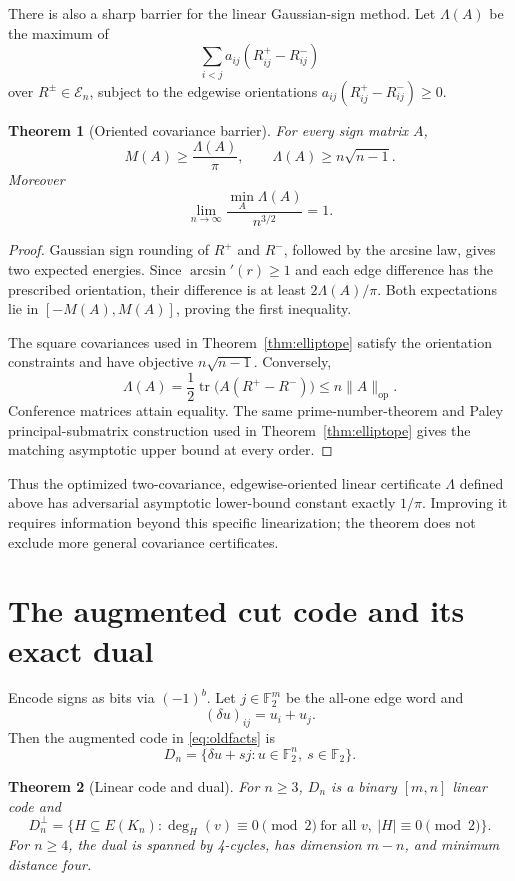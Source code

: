 \documentclass[11pt]{article}
\newtheorem{theorem}{Theorem}
\newcommand{\cE}{\mathcal E}
\newcommand{\Ftwo}{\mathbb F_2}
\DeclareMathOperator{\tr}{tr}
\begin{document}
There is also a sharp barrier for the linear Gaussian-sign method.  Let
\(\Lambda(A)\) be the maximum of
\[
 \sum_{i<j}a_{ij}(R^+_{ij}-R^-_{ij})
\]
over \(R^\pm\in\cE_n\), subject to the edgewise orientations
\(a_{ij}(R^+_{ij}-R^-_{ij})\ge0\).

\begin{theorem}[Oriented covariance barrier]
\label{thm:lambda}
For every sign matrix \(A\),
\[
 M(A)\ge\frac{\Lambda(A)}\pi,
 \qquad
 \Lambda(A)\ge n\sqrt{n-1}.
\]
Moreover
\[
 \boxed{\displaystyle
 \lim_{n\to\infty}
 \frac{\min_A\Lambda(A)}{n^{3/2}}=1.}
\]
\end{theorem}

\begin{proof}
Gaussian sign rounding of \(R^+\) and \(R^-\), followed by the arcsine law,
gives two expected energies.  Since \(\arcsin'(r)\ge1\) and each edge
difference has the prescribed orientation, their difference is at least
\(2\Lambda(A)/\pi\).  Both expectations lie in \([-M(A),M(A)]\), proving the
first inequality.

The square covariances used in Theorem~\ref{thm:elliptope} satisfy the
orientation constraints and have objective \(n\sqrt{n-1}\).  Conversely,
\[
 \Lambda(A)=\frac12\tr\bigl(A(R^+-R^-)\bigr)
 \le n\|A\|_{\mathrm{op}}.
\]
Conference matrices attain equality.  The same prime-number-theorem and Paley
principal-submatrix construction used in Theorem~\ref{thm:elliptope} gives the
matching asymptotic upper bound at every order.
\end{proof}

Thus the optimized two-covariance, edgewise-oriented linear certificate
\(\Lambda\) defined above has adversarial asymptotic lower-bound constant
exactly \(1/\pi\).  Improving it requires information beyond this specific
linearization; the theorem does not exclude more general covariance
certificates.

\section{The augmented cut code and its exact dual}

Encode signs as bits via \((-1)^b\).  Let \(j\in\Ftwo^m\) be the all-one edge
word and
\[
 (\delta u)_{ij}=u_i+u_j.
\]
Then the augmented code in \eqref{eq:oldfacts} is
\[
 D_n=\{\delta u+s j:u\in\Ftwo^n,\ s\in\Ftwo\}.
\]

\begin{theorem}[Linear code and dual]
\label{thm:codedual}
For \(n\ge3\), \(D_n\) is a binary \([m,n]\) linear code and
\[
 D_n^\perp=
 \{H\subseteq E(K_n):
 \deg_H(v)\equiv0\pmod2\ \text{for all }v,
 \ |H|\equiv0\pmod2\}.
\]
For \(n\ge4\), the dual is spanned by 4-cycles, has dimension \(m-n\), and
minimum distance four.
\end{theorem}
\end{document}
